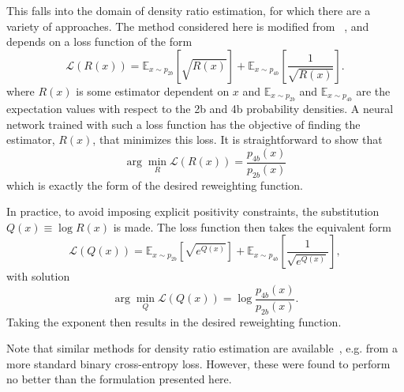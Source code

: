 This falls into the domain of density ratio estimation, for which there are a variety
of approaches. The method considered here is modified from ~\cite{NNloss, NNloss1}, and depends on
a loss function of the form
\begin{equation}
\mathcal{L}(R(x)) = \mathbb{E}_{x\sim p_{2b}}[\sqrt{R(x)}]
+\mathbb{E}_{x\sim p_{4b}}[\frac{1}{\sqrt{R(x)}}].
\end{equation}
where $R(x)$ is some estimator dependent on $x$ and $\mathbb{E}_{x\sim p_{2b}}$ and 
$\mathbb{E}_{x\sim p_{4b}}$ are the expectation values with respect to the 2b and 4b probability 
densities. A neural network trained with such a loss function has the objective of finding
the estimator, $R(x)$, that minimizes this loss. It is straightforward to show that
\begin{equation}
\arg \min_{R}\mathcal{L}(R(x)) = \frac{p_{4b}(x)}{p_{2b}(x)}
\end{equation}
which is exactly the form of the desired reweighting function.

In practice, to avoid imposing explicit positivity constraints, the substitution
$Q(x) \equiv \log R(x)$ is made. The loss function then takes the equivalent form
\begin{equation}
\mathcal{L}(Q(x)) = \mathbb{E}_{x\sim p_{2b}}[\sqrt{e^{Q(x)}}]
+\mathbb{E}_{x\sim p_{4b}}[\frac{1}{\sqrt{e^{Q(x)}}}],
\end{equation}
with solution
\begin{equation}
\arg \min_{Q}\mathcal{L}(Q(x)) = \log\frac{p_{4b}(x)}{p_{2b}(x)}.
\end{equation}
Taking the exponent then results in the desired reweighting function.

Note that similar methods for density ratio estimation are available~\cite{NNRW-Nachman},
e.g. from a more standard binary cross-entropy loss. However, these were found to
perform no better than the formulation presented here.

